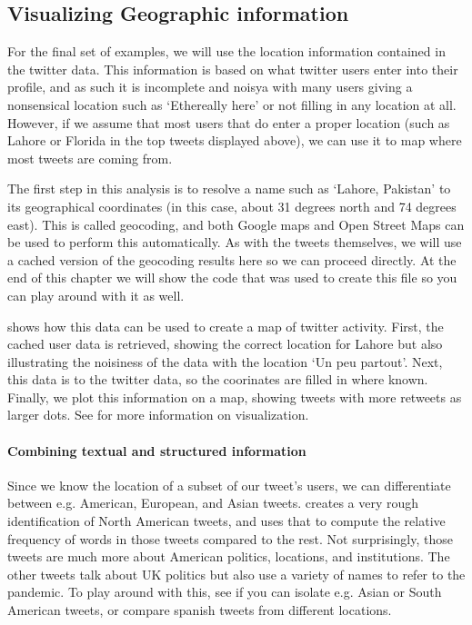 
\subsection{Visualizing Geographic information}
For the final set of examples, we will use the location information contained in the twitter data.
This information is based on what twitter users enter into their profile, and as such it is incomplete and noisya
with many users giving a nonsensical location such as `Ethereally here' or not filling in any location at all.
However, if we assume that most users that do enter a proper location (such as Lahore or Florida in the top tweets displayed above),
we can use it to map where most tweets are coming from.

The first step in this analysis is to resolve a name such as `Lahore, Pakistan' to its geographical coordinates (in this case, about 31 degrees north and 74 degrees east). This is called geocoding, and both Google maps and Open Street Maps can be used
to perform this automatically.
As with the tweets themselves, we will use a cached version of the geocoding results here so we can proceed directly. 
At the end of this chapter we will show the code that was used to create this file so you can play around with it as well. 

 shows how this data can be used to create a map of twitter activity.
First, the cached user data is retrieved, showing the correct location for Lahore but also
illustrating the noisiness of the data with the location `Un peu partout'.
Next, this data is  to the twitter data, so the coorinates are filled in where known.
Finally, we plot this information on a map, showing tweets with more retweets as larger dots.
See  for more information on visualization.



\paragraph{Combining textual and structured information}
Since we know the location of a subset of our tweet's users,
we can differentiate between e.g. American, European, and Asian tweets.
 creates a very rough identification of North American tweets,
and uses that to compute the relative frequency of words in those tweets compared to the rest.
Not surprisingly, those tweets are much more about American politics, locations, and institutions.
The other tweets talk about UK politics but also use a variety of names to refer to the pandemic.
To play around with this, see if you can isolate e.g. Asian or South American tweets,
or compare spanish tweets from different locations.

